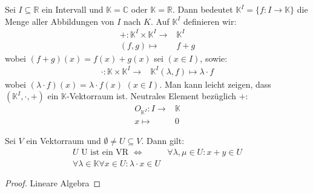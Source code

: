 \begin{Bemerkung}{
	Sei $I \subseteq \mathbb{R}$ ein Intervall und $\mathbb{K} = \mathbb{C}$ oder
	$\mathbb{K} = \mathbb{R}$. Dann bedeutet $\mathbb{K}^I = \{f: I \rightarrow 
	\mathbb{K}\}$ die Menge aller Abbildungen von $I$ nach $K$. Auf $\mathbb{K}^I$ 
	definieren wir:
	\begin{align*}
		+ : \mathbb{K}^I \times \mathbb{K}^I \rightarrow & \mathbb{K}^I \\
		(f,g) \mapsto & f + g
	\end{align*}
	wobei $(f+g)(x) = f(x)+g(x)$ sei $(x \in I)$, sowie:
	\begin{align*}
		\cdot : \mathbb{K} \times \mathbb{K}^I \rightarrow & \mathbb{K}^I
		(\lambda, f) \mapsto \lambda \cdot f
	\end{align*}
	wobei $(\lambda \cdot f)(x) = \lambda \cdot f(x)$ $(x \in I)$.
	Man kann leicht zeigen, dass $(\mathbb{K}^I, \cdot, +)$ ein 
	$\mathbb{K}$-Vektorraum ist. Neutrales Element bezüglich $+$:
	\begin{align*}
		O_{\mathbb{K}^I} : I \rightarrow & \mathbb{K} \\
		x \mapsto & 0
	\end{align*}
}\end{Bemerkung}

\begin{Satz}{
	Sei $V$ ein Vektorraum und $\emptyset \neq U \subseteq V$. Dann gilt:
	\begin{align*}
		U \text{ U ist ein VR } \Leftrightarrow &
		\forall \lambda, \mu \in U : x + y \in U \\
		\forall \lambda \in \mathbb{K} \forall x \in U: \lambda \cdot x \in U
	\end{align*}
}\end{Satz}
\begin{proof}
	Lineare Algebra
\end{proof}

